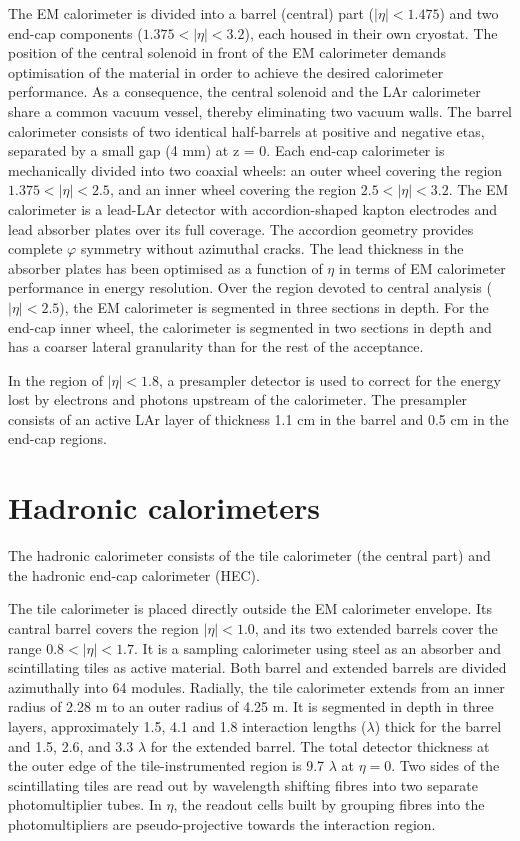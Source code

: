 The EM calorimeter is divided into a barrel (central) part ($|\eta| < 1.475$) and two end-cap components
($1.375 < |\eta| < 3.2$), each housed in their own cryostat. The position of the central solenoid in
front of the EM calorimeter demands optimisation of the material in order to achieve the desired calorimeter
performance. As a consequence, the central solenoid and the LAr calorimeter
share a common vacuum vessel, thereby eliminating two vacuum walls. The barrel calorimeter
consists of two identical half-barrels at positive and negative etas, separated by a small gap (4 mm) at z = 0. Each end-cap
calorimeter is mechanically divided into two coaxial wheels: an outer wheel covering the region
$1.375 < |\eta| < 2.5$, and an inner wheel covering the region $2.5 < |\eta| < 3.2$. The EM calorimeter is
a lead-LAr detector with accordion-shaped kapton electrodes and lead absorber plates over its full
coverage. The accordion geometry provides complete $\varphi$ symmetry without azimuthal cracks. The lead thickness in the absorber plates has been optimised as a function of $\eta$ in terms of EM calorimeter performance in energy resolution. Over the region devoted to central analysis ($|\eta| < 2.5$), the
EM calorimeter is segmented in three sections in depth. For the end-cap inner wheel, the calorimeter is segmented in two sections in depth and has a coarser lateral granularity than for the rest of the acceptance.

In the region of $|\eta| < 1.8$, a presampler detector is used to correct for the energy lost by
electrons and photons upstream of the calorimeter. The presampler consists of an active LAr layer
of thickness 1.1 cm in the barrel and 0.5 cm in the end-cap regions.


\section{Hadronic calorimeters}
\label{sec:ATLAS_H_calo}


The hadronic calorimeter consists of the tile calorimeter (the central part) and the hadronic end-cap calorimeter (HEC).

The tile calorimeter is placed directly outside the EM calorimeter envelope. Its
cantral barrel covers the region $|\eta| < 1.0$, and its two extended barrels cover the range $0.8 < |\eta| < 1.7$. It is a
sampling calorimeter using steel as an absorber and scintillating tiles as active material. Both
barrel and extended barrels are divided azimuthally into 64 modules. Radially, the tile calorimeter
extends from an inner radius of 2.28 m to an outer radius of 4.25 m. It is segmented in depth in three
layers, approximately 1.5, 4.1 and 1.8 interaction lengths ($\lambda$) thick for the barrel and 1.5, 2.6, and
3.3 $\lambda$ for the extended barrel. The total detector thickness at the outer edge of the tile-instrumented
region is 9.7 $\lambda$ at $\eta=0$. Two sides of the scintillating tiles are read out by wavelength shifting
fibres into two separate photomultiplier tubes. In $\eta$, the readout cells built by grouping fibres into
the photomultipliers are pseudo-projective towards the interaction region.

